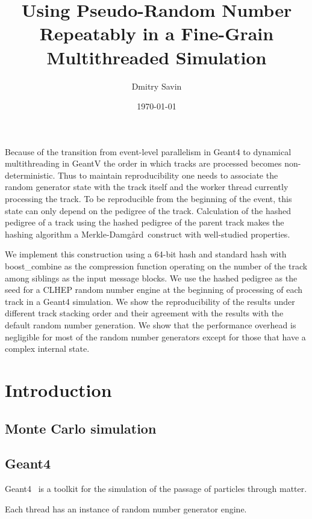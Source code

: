 \documentclass[a4paper, titlepage, 12pt]{article} %
\title{Using Pseudo-Random Number Repeatably in a Fine-Grain Multithreaded Simulation}
\author{Dmitry Savin}
\date{\today}
\newcommand{\MD}{Merkle-Damg\r{a}rd}
\begin{document}
 \maketitle
 
 \abstract
  Because of the transition from event-level parallelism in Geant4 to dynamical multithreading in GeantV the order in which tracks are processed becomes non-deterministic.
  Thus to maintain reproducibility one needs to associate the random generator state with the track itself and the worker thread currently processing the track.
  To be reproducible from the beginning of the event, this state can only depend on the pedigree of the track.
  Calculation of the hashed pedigree of a track using the hashed pedigree of the parent track makes the hashing algorithm a \MD\ construct with well-studied properties.
  
  We implement this construction using a 64-bit hash and standard hash with boost\_combine as the compression function operating on the number of the track among siblings as the input message blocks.
  We use the hashed pedigree as the seed for a CLHEP random number engine at the beginning of processing of each track in a Geant4 simulation.
  We show the reproducibility of the results under different track stacking order and their agreement with the results with the default random number generation.
  We show that the performance overhead is negligible for most of the random number generators except for those that have a complex internal state.
  
 \newpage
 \tableofcontents
 \newpage
  
 \section{Introduction}
  \subsection{Monte Carlo simulation}
  \subsection{Geant4}
   Geant4~\cite{AGOSTINELLI2003250, 1610988, ALLISON2016186} is a toolkit for the simulation of the passage of particles through matter.
   
   
   \cite{GEANT4-MT}
   Each thread has an instance of random number generator engine.
   
\end{document}
